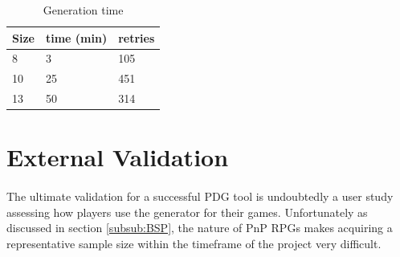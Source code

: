 \documentclass{UoYCSproject}
\begin{document}
  \begin{table}[]
    \centering
    \begin{tabular}{@{}lll@{}}
    \toprule
    Size & time (min) & retries \\ \midrule
    8    & 3          & 105     \\
    10   & 25         & 451     \\
    13   & 50         & 314     \\ \bottomrule
    \end{tabular}
    \caption{Generation time}
    \label{tab:gen_time}
    \end{table}
\section{External Validation} %
\paragraph{}
The ultimate validation for a successful PDG tool is undoubtedly a user study assessing how players use the generator for their games. Unfortunately as discussed in section \ref{subsub:BSP}, the nature of PnP RPGs makes acquiring a representative sample size within the timeframe of the project very difficult. 

\end{document}
